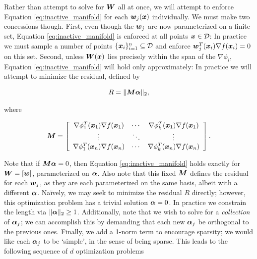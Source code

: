 \documentclass[]{aiaa-tc}%
\newcommand{\dom}{\mathcal{D}}
\begin{document}
Rather than attempt to solve for $\boldsymbol{W}$ all at once, we will attempt to enforce Equation \ref{eq:inactive_manifold} for each $\boldsymbol{w}_j(\boldsymbol{x})$ individually. We must make two concessions though. First, even though the $\boldsymbol{w}_j$ are now parameterized on a finite set, Equation \ref{eq:inactive_manifold} is enforced at all points $\vx\in\dom$: In practice we must sample a number of points $\{\vx_i\}_{i=1}^n\subseteq\dom$ and enforce $\boldsymbol{w}_j^T(\boldsymbol{x}_i)\nabla f(\boldsymbol{x}_i)=0$ on this set. Second, unless $\boldsymbol{W}(\boldsymbol{x})$ lies precisely within the span of the $\nabla\phi_i$, Equation \ref{eq:inactive_manifold} will hold only approximately: In practice we will attempt to minimize the residual, defined by
\nomenclature{$n$}{Number of sample points in $\dom$}%

\begin{equation}
\label{eq:residual}
R = \|\boldsymbol{M}\boldsymbol{\alpha}\|_2,
\end{equation}

where

\begin{equation}
\label{eq:matrix_m}
\mM = \left[\begin{array}{ccc}%
    \nabla\phi_1^T(\vx_1)\nabla f(\vx_1) & \cdots & \nabla\phi_k^T(\vx_1)\nabla f(\vx_1) \\
    \vdots & \ddots & \vdots \\
    \nabla\phi_1^T(\vx_n)\nabla f(\vx_n) & \cdots & \nabla\phi_k^T(\vx_n)\nabla f(\vx_n) \\
    \end{array}\right].
\end{equation}

Note that if $\boldsymbol{M}\boldsymbol{\alpha}=0$, then Equation \ref{eq:inactive_manifold} holds exactly for $\boldsymbol{W}=[\boldsymbol{w}]$, parameterized on $\boldsymbol{\alpha}$. Also note that this fixed $\boldsymbol{M}$ defines the residual for each $\boldsymbol{w}_j$, as they are each parameterized on the same basis, albeit with a different $\boldsymbol{\alpha}$. Na{\"i}vely, we may seek to minimize the residual $R$ directly; however, this optimization problem has a trivial solution $\boldsymbol{\alpha}=0$. In practice we constrain the length via $\|\boldsymbol{\alpha}\|_2\geq1$. Additionally, note that we wish to solve for a \emph{collection} of $\boldsymbol{\alpha}_j$; we can accomplish this by demanding that each new $\boldsymbol{\alpha}_j$ be orthogonal to the previous ones. Finally, we add a 1-norm term to encourage sparsity; we would like each $\boldsymbol{\alpha}_j$ to be `simple', in the sense of being sparse. This leads to the following sequence of $d$ optimization problems
%
\end{document}
